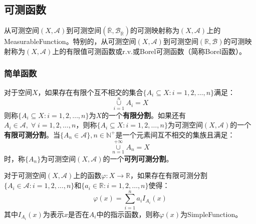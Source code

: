 \subsection{可测函数}
\begin{definition}
	从可测空间$(X,\mathscr{A})$到可测空间$(\overline{\mathbb{R}},\mathcal{B}_{\overline{\mathbb{R}}})$的可测映射称为$(X,\mathscr{A})$上的\gls{MeasurableFunction}。特别的，从可测空间$(X,\mathscr{A})$到可测空间$(\mathbb{R},\mathcal{B})$的可测映射称为$(X,\mathscr{A})$上的有限值可测函数或\gls{r.v.}或Borel可测函数（简称Borel函数）。
\end{definition}
\subsubsection{简单函数}
\begin{definition}
	对于空间$X$，如果存在有限个互不相交的集合$\{A_i\subseteq X:i=1,2,\dots,n\}$满足：
	\begin{equation*}
		\underset{i=1}{\overset{n}{\cup}}A_i=X
	\end{equation*}
	则称$\{A_i\subseteq X:i=1,2,\dots,n\}$为$X$的一个\textbf{有限分割}。如果还有$A_i\in \mathscr{A},\;\forall\;i=1,2,\dots,n$，则称$\{A_i\subseteq X:i=1,2,\dots,n\}$为可测空间$(X,\mathscr{A})$的一个\textbf{有限可测分割}。当$\{A_n\in\mathscr{A}\},n\in\mathbb{N}^+$是一个元素间互不相交的集族且满足：
	\begin{equation*}
		\underset{n=1}{\overset{+\infty}{\cup}}A_n=X
	\end{equation*}
	时，称$\{A_n\}$为可测空间$(X,\mathscr{A})$的一个\textbf{可列可测分割}。
\end{definition}
\begin{definition}
	对于可测空间$(X,\mathscr{A})$上的函数$\varphi:X\rightarrow \mathbb{R}$，如果存在有限可测分割$\{A_i\in \mathscr{A}:i=1,2,\dots,n\}$和$\{a_i\in\mathbb{R}:i=1,2,\dots,n\}$使得：
	\begin{equation*}
		\varphi(x)=\sum_{i=1}^{n}a_iI_{A_i}(x)
	\end{equation*}
	其中$I_{A_i}(x)$为表示$x$是否在$A_i$中的指示函数，则称$\varphi(x)$为\gls{SimpleFunction}。
\end{definition}
